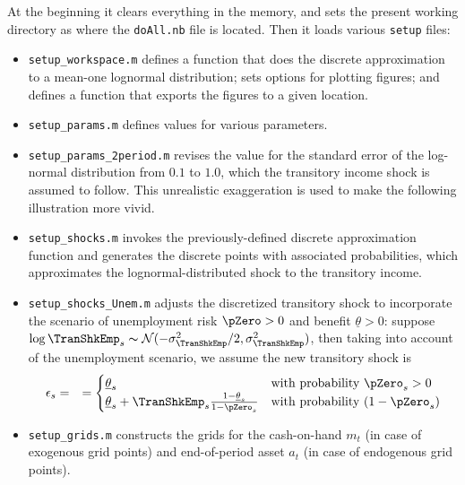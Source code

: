 \documentclass[titlepage,abstract]{\econtex}
\providecommand{\thetaMin}{\underline{\theta}}
\begin{document}
At the beginning it clears everything in the memory, and sets the present working directory as where the \texttt{doAll.nb} file is located. Then it loads various \texttt{setup} files:
\begin{itemize}
      \item \texttt{setup\_workspace.m} defines a function that does the discrete approximation to a mean-one lognormal distribution; sets options for plotting figures; and defines a function that exports the figures to a given location.
      \item \texttt{setup\_params.m} defines values for various parameters.
      \item \texttt{setup\_params\_2period.m} revises the value for the standard error of the log-normal distribution from $0.1$ to $1.0$, which the transitory income shock is assumed to follow. This unrealistic exaggeration is used to make the following illustration more vivid.
      \item \texttt{setup\_shocks.m} invokes the previously-defined discrete approximation function and generates the discrete points with associated probabilities, which approximates the lognormal-distributed shock to the transitory income.
      \item \texttt{setup\_shocks\_Unem.m} adjusts the discretized transitory shock to incorporate the scenario of unemployment risk $\pZero>0$ and benefit $\thetaMin>0$: suppose $\log \TranShkEmp_{s}\thicksim \mathcal{N}(-\sigma_{\TranShkEmp}^{2}/2, \sigma_{\TranShkEmp}^{2})$, then taking into account of the unemployment scenario, we assume the new transitory shock is
          \begin{equation}\begin{gathered}\begin{aligned}
          \epsilon_{s}  &=& =  
          \begin{cases}
            \thetaMin_{s} & \text{with probability $\pZero_{s}>0$} \\
            \thetaMin_{s} + \TranShkEmp_{s}\frac{1-\thetaMin_{s}}{1-\pZero_{s}}  & \text{with probability $(1-\pZero_{s})$}
          \end{cases}
          \end{aligned}\end{gathered}\end{equation}
      \item \texttt{setup\_grids.m} constructs the grids for the cash-on-hand $m_{t}$ (in case of exogenous grid points) and end-of-period asset $a_{t}$ (in case of endogenous grid points).

\end{itemize}
\end{document}
